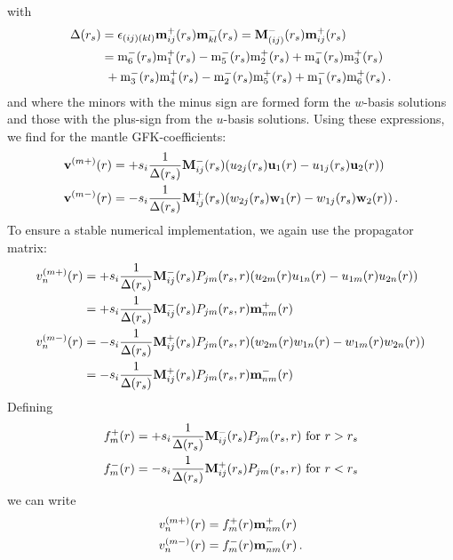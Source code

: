 \documentclass[12pt,a4paper]{article}
\begin{document}
with
\begin{align}
\Delta(r_s)  &=  \epsilon_{(ij)(kl)}\mathbf{m}^+_{ij}(r_s)\mathbf{m}^{-}_{kl}(r_s) 
= \mathbf{M}^-_{(ij)}(r_s)\mathbf{m}^+_{ij}(r_s) \notag \\
& = \mathrm{m}^{-}_6(r_s)\mathrm{m}^{+}_1(r_s) - \mathrm{m}^{-}_5(r_s)\mathrm{m}^{+}_2(r_s)+\mathrm{m}^{-}_4(r_s)\mathrm{m}^{+}_3(r_s) \notag \\
&\  +\mathrm{m}^{-}_3(r_s)\mathrm{m}^{+}_4(r_s)-\mathrm{m}^{-}_2(r_s)\mathrm{m}^{+}_5(r_s)+\mathrm{m}^{-}_1(r_s)\mathrm{m}^{+}_6(r_s) \,.
\end{align}
and where the minors with the minus sign are formed form the $w$-basis solutions and those with the plus-sign from the $u$-basis solutions.  
Using these expressions, we find for the mantle GFK-coefficients:
\begin{align}
\mathbf{v}^{(m+)}(r) &= +s_i\frac{1}{\Delta(r_s)}\mathbf{M}^-_{ij}(r_s)(u_{2j}(r_s)\mathbf{u}_1(r)-u_{1j}(r_s)\mathbf{u}_2(r)) \notag \\
\mathbf{v}^{(m-)}(r) &= -s_i\frac{1}{\Delta(r_s)}\mathbf{M}^+_{ij}(r_s)(w_{2j}(r_s)\mathbf{w}_1(r)-w_{1j}(r_s)\mathbf{w}_2(r))\,.
\end{align}
To ensure a stable numerical implementation, we again use the propagator matrix:
\begin{align}
v_n^{(m+)}(r) &= +s_i\frac{1}{\Delta(r_s)}\mathbf{M}^-_{ij}(r_s)P_{jm}(r_s,r)(u_{2m}(r)u_{1n}(r)-u_{1m}(r)u_{2n}(r)) \notag \\
& = +s_i\frac{1}{\Delta(r_s)}\mathbf{M}^-_{ij}(r_s) P_{jm}(r_s,r)\mathbf{m}^{+}_{nm}(r) \notag \\
v_n^{(m-)}(r) &= -s_i\frac{1}{\Delta(r_s)}\mathbf{M}^+_{ij}(r_s)P_{jm}(r_s,r)(w_{2m}(r)w_{1n}(r)-w_{1m}(r)w_{2n}(r)) \notag \\
& = -s_i\frac{1}{\Delta(r_s)}\mathbf{M}^+_{ij}(r_s)P_{jm}(r_s,r)\mathbf{m}^{-}_{nm}(r)
\end{align}
Defining
\begin{align}\label{adjoint}
f_m^+(r) & = +s_i\frac{1}{\Delta(r_s)}\mathbf{M}^-_{ij}(r_s) P_{jm}(r_s,r) \ \mathrm{for}\ r>r_s \notag \\
f_m^-(r) &= -s_i\frac{1}{\Delta(r_s)}\mathbf{M}^+_{ij}(r_s) P_{jm}(r_s,r)\ \mathrm{for}\ r<r_s
\end{align}
we can write
\begin{align}
v_n^{(m+)}(r) & = f_m^+(r)\mathbf{m}^{+}_{nm}(r) \notag \\
v_n^{(m-)}(r) &= f_m^-(r)\mathbf{m}^{-}_{nm}(r) \,.
\end{align}
\end{document}
